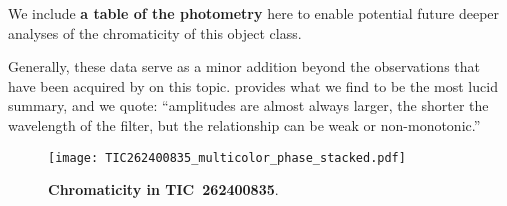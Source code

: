 \documentclass[11pt,twocolumn,tighten]{aastex63}
\begin{document}
We include {\bf a table of the photometry} here to enable potential
future deeper analyses of the chromaticity of this object class.

Generally, these data serve as a minor addition beyond the
observations that have been acquired by
\citet[e.g.][]{2017PASJ...69L...2O,2020PASJ...72...23T,2022AJ....163..144G,2023MNRAS.518.2921K}
on this topic.  \citet{2023MNRAS.518.2921K} provides what we find to
be the most lucid summary, and we quote: ``amplitudes are almost
always larger, the shorter the wavelength of the filter, but the
relationship can be weak or non-monotonic.''

\begin{figure*}[!t]
	\begin{center}
    \texttt{[image: TIC262400835\_multicolor\_phase\_stacked.pdf]}
    	\end{center}
    \vspace{-0.4cm}
		\caption{
	      {\bf Chromaticity in TIC~262400835}.
		}
		\label{fig:muscat}
\end{figure*}



\clearpage
\listofchanges
\end{document}
